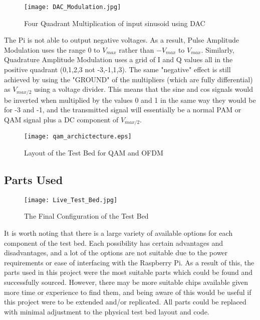 \documentclass[../main.tex]{subfiles}
\begin{document}
\begin{figure}[ht]
	\centering
	\texttt{[image: DAC\_Modulation.jpg]}
	\caption{Four Quadrant Multiplication of input sinusoid using DAC}
	\label{fig_}
\end{figure}

The Pi is not able to output negative voltages.
As a result, Pulse Amplitude Modulation uses the range $0$ to $V_{max}$ rather than $-V_{max}$ to $V_{max}$.
Similarly, Quadrature Amplitude Modulation uses a grid of I and Q values all in the positive quadrant (0,1,2,3 not -3,-1,1,3).
The same "negative" effect is still achieved by using the "GROUND" of the multipliers (which are fully differential)
as $V_{max/2}$ using a voltage divider.
This means that the sine and cos signals would be inverted when multiplied by the values 0 and 1 in the same way they would be for -3 and -1, and the transmitted signal will essentially be a normal PAM or QAM signal plus a DC component of $V_{max/2}$.

\begin{figure}[ht]
	\centering
	\texttt{[image: qam\_archictecture.eps]}
	\caption{Layout of the Test Bed for QAM and OFDM}
	\label{fig_QAM Layout}
\end{figure}

\subsection{Parts Used}

\begin{figure}[ht]
	\centering
	\texttt{[image: Live\_Test\_Bed.jpg]}
	\caption{The Final Configuration of the Test Bed}
\end{figure}


It is worth noting that there is a large variety of available options for each component of the test bed.
Each possibility has certain advantages and disadvantages, and a lot of the options are not suitable due to the power requirements or ease of interfacing with the Raspberry Pi.
As a result of this, the parts used in this project were the most suitable parts which could be found and successfully sourced.
However, there may be more suitable chips available given more time or experience to find them, and being aware of this would be useful if this project were to be extended and/or replicated.
All parts could be replaced with minimal adjustment to the physical test bed layout and code.\\
\end{document}
